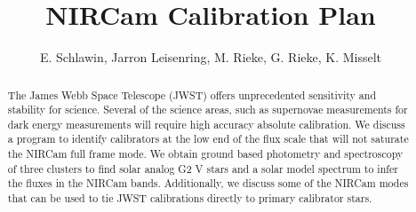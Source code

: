 \documentclass{aastex6}
\begin{document}

\title{NIRCam Calibration Plan}


\author{E. Schlawin, Jarron Leisenring, M. Rieke, G. Rieke, K. Misselt}




\begin{abstract}
The James Webb Space Telescope (JWST) offers unprecedented sensitivity and stability for science.
Several of the science areas, such as supernovae measurements for dark energy measurements will require high accuracy absolute calibration.
We discuss a program to identify calibrators at the low end of the flux scale that will not saturate the NIRCam full frame mode.
We obtain ground based photometry and spectroscopy of three clusters to find solar analog G2 V stars and a solar model spectrum to infer the fluxes in the NIRCam bands.
Additionally, we discuss some of the NIRCam modes that can be used to tie JWST calibrations directly to primary calibrator stars.
\end{abstract}

\end{document}
